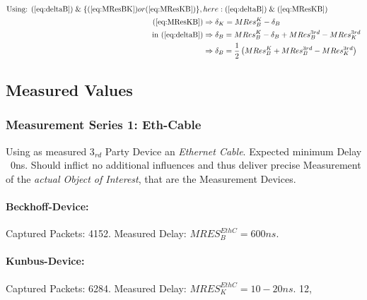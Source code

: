 \npi%

\begin{subequations}
	\begin{align}
	\label{eq:deltaK}
	\text{Using: } (\ref{eq:deltaB})\;\&\;\{(\ref{eq:MResBK}) or (\ref{eq:MResKB})\},{}& here: (\ref{eq:deltaB})\;\&\;(\ref{eq:MResKB})\notag\\
	(\ref{eq:MResKB}) {}&\Rightarrow \delta_K = MRes_{B}^{K} - \delta_B\\
	\text{in } (\ref{eq:deltaB}) {}&\Rightarrow \delta_B = MRes_{B}^{K} - \delta_B + MRes_{B}^{3rd} - MRes_{K}^{3rd}\notag\\
	{}&\Rightarrow \delta_B = \frac{1}{2} \left( MRes_{B}^{K} + MRes_{B}^{3rd} - MRes_{K}^{3rd} \right)
	\end{align}
\end{subequations}




\subsection{Measured Values}


\subsubsection{Measurement Series 1: Eth-Cable}

Using as measured 3$_{rd}$ Party Device an \textit{Ethernet Cable}. Expected minimum Delay ~0ns. Should inflict no additional influences and thus deliver precise Measurement of the \textit{actual Object of Interest}, that are the Measurement Devices.

\paragraph{Beckhoff-Device:}

Captured Packets: 4152.\nl%
Measured Delay: $MRES_B^{EthC}=600ns$.


\paragraph{Kunbus-Device:}

Captured Packets: 6284.\nl%
Measured Delay: $MRES_K^{EthC}=10-20ns$.
12,





